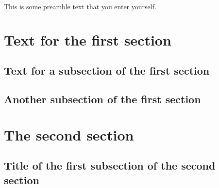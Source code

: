 \documentclass{article}
\begin{document}
This is some preamble text that you enter yourself.

\section{Text for the first section}
\lipsum[1]

\subsection{Text for a subsection of the first section}
\lipsum[2-3]

\subsection{Another subsection of the first section}
\lipsum[4-5]

\section{The second section}
\lipsum[6]

\subsection{Title of the first subsection of the second section}
\lipsum[7]
\end{document}
